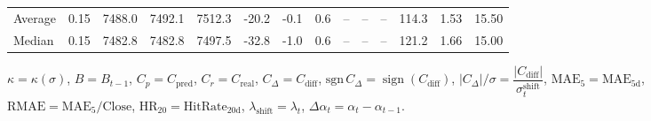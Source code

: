 \begin{threeparttable}
{\begin{tabular}{lrrrrrrrrrrrrr}
Average &     0.15 & 7488.0 & 7492.1 & 7512.3 &      -20.2 &                     -0.1 &                 0.6 &         -- &        -- &             -- &            114.3 &            1.53 &                  15.50 \\
 Median &     0.15 & 7482.8 & 7482.8 & 7497.5 &      -32.8 &                     -1.0 &                 0.6 &         -- &        -- &             -- &            121.2 &            1.66 &                  15.00 \\
\bottomrule
\end{tabular}
}
\begin{tablenotes}\footnotesize
\item $\kappa=\kappa(\sigma)$, $B=B_{t-1}$, $C_p=C_{\text{pred}}$, $C_r=C_{\text{real}}$, $C_\Delta=C_{\text{diff}}$, $\mathrm{sgn}\,C_\Delta=\operatorname{sign}(C_{\text{diff}})$, $|C_\Delta|/\sigma=\dfrac{|C_{\text{diff}}|}{\sigma_t^{\text{shift}}}$, $\mathrm{MAE}_5=\mathrm{MAE}_{5\text{d}}$, $\mathrm{RMAE}= \mathrm{MAE}_5 / \text{Close}$, $\mathrm{HR}_{20}=\mathrm{HitRate}_{20\text{d}}$, 
$\lambda_{\text{shift}}=\lambda_t$, 
$\Delta\alpha_t=\alpha_t-\alpha_{t-1}$.
\end{tablenotes}
\end{threeparttable}
\endgroup

